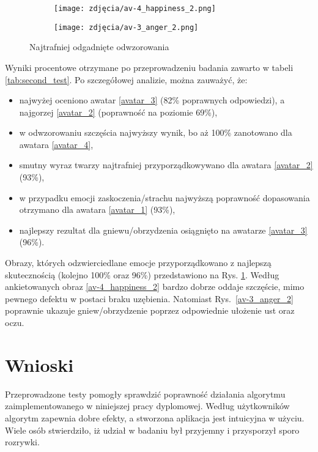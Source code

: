 \begin{figure}[h]
	\centering
	\begin{subfigure}{0.35\textwidth}
		\centering
		\texttt{[image: zdjęcia/av-4\_happiness\_2.png]}
		\subcaption{\label{av-4_happiness_2}}
	\end{subfigure}
	\begin{subfigure}{0.35\textwidth}
		\centering
		\texttt{[image: zdjęcia/av-3\_anger\_2.png]}
		\subcaption{\label{av-3_anger_2}}
	\end{subfigure}

	
	\caption{\label{fig:best_results}Najtrafniej odgadnięte odwzorowania}
\end{figure}

Wyniki procentowe otrzymane po przeprowadzeniu badania zawarto w tabeli \ref{tab:second_test}. Po szczegółowej analizie, można zauważyć, że:
\begin{itemize}
    \item najwyżej oceniono awatar \ref{avatar_3} (82\% poprawnych odpowiedzi), a najgorzej \ref{avatar_2} (poprawność na poziomie 69\%),
    \item w odwzorowaniu szczęścia najwyższy wynik, bo aż 100\% zanotowano dla awatara \ref{avatar_4},
    \item smutny wyraz twarzy najtrafniej przyporządkowywano dla awatara \ref{avatar_2} (93\%),
    \item w przypadku emocji zaskoczenia/strachu najwyższą poprawność dopasowania otrzymano dla awatara \ref{avatar_1} (93\%),
    \item najlepszy rezultat dla gniewu/obrzydzenia osiągnięto na awatarze \ref{avatar_3} (96\%).
\end{itemize}

Obrazy, których odzwierciedlane emocje przyporządkowano z najlepszą skutecznością (kolejno 100\% oraz 96\%) przedstawiono na Rys. \ref{fig:best_results}. Według ankietowanych obraz \ref{av-4_happiness_2} bardzo dobrze oddaje szczęście, mimo pewnego defektu w postaci braku uzębienia. Natomiast Rys.~\ref{av-3_anger_2} poprawnie ukazuje gniew/obrzydzenie poprzez odpowiednie ułożenie ust oraz oczu. 


\section{Wnioski}
Przeprowadzone testy pomogły sprawdzić poprawność działania algorytmu zaimplementowanego w niniejszej pracy dyplomowej. Według użytkowników algorytm zapewnia dobre efekty, a stworzona aplikacja jest intuicyjna w użyciu. Wiele osób stwierdziło, iż udział w badaniu był przyjemny i przysporzył sporo rozrywki.

